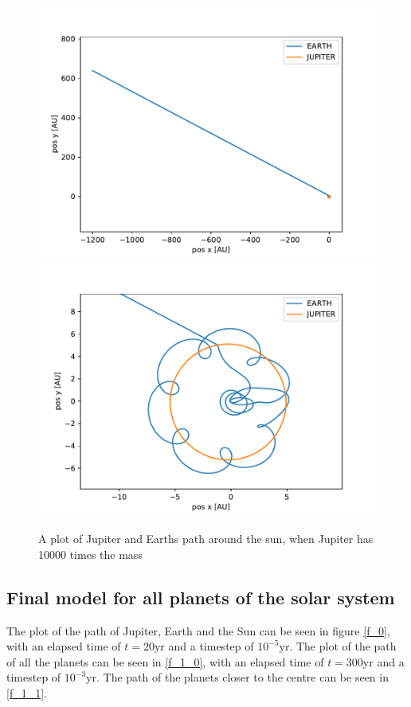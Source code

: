 \documentclass[a4paper]{article}
\begin{document}
\begin{figure}[h!]
	\centering 
	\includegraphics[scale=0.56]{../opp_e1000.pdf}
	\includegraphics[scale=0.56]{../opp_e1000-0.pdf}
	\caption{A plot of Jupiter and Earths path around the sun, when Jupiter has 10000 times the mass}
	\label{e_1000}
\end{figure}

\subsection{Final model for all planets of the solar system}
The plot of the path of Jupiter, Earth and the Sun can be seen in figure \ref{f_0}, with an elapsed time of $t=20\text{yr}$ and a timestep of $10^{-5} \text{yr}$. The plot of the path of all the planets can be seen in \ref{f_1_0}, with an elapsed time of $t=300\text{yr}$ and a timestep of $10^{-3} \text{yr}$. The path of the planets closer to the centre can be seen in \ref{f_1_1}.
\end{document}
